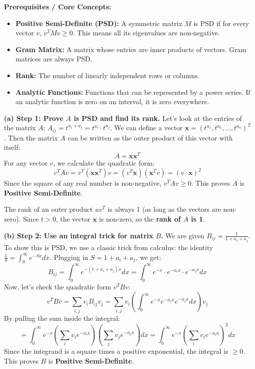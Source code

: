 \begin{solution}
\textbf{Prerequisites / Core Concepts:}
\begin{itemize}
    \item \textbf{Positive Semi-Definite (PSD):} A symmetric matrix $M$ is PSD if for every vector $v$, $v^T M v \geq 0$. This means all its eigenvalues are non-negative.
    \item \textbf{Gram Matrix:} A matrix whose entries are inner products of vectors. Gram matrices are always PSD.
    \item \textbf{Rank:} The number of linearly independent rows or columns.
    \item \textbf{Analytic Functions:} Functions that can be represented by a power series. If an analytic function is zero on an interval, it is zero everywhere.
\end{itemize}

\textbf{(a) Step 1: Prove $A$ is PSD and find its rank.}
Let's look at the entries of the matrix $A$: $A_{ij} = t^{a_i + a_j} = t^{a_i} \cdot t^{a_j}$.
We can define a vector $\mathbf{x} = (t^{a_1}, t^{a_2}, \dots, t^{a_n})^T$. Then the matrix $A$ can be written as the outer product of this vector with itself:
\[ A = \mathbf{x} \mathbf{x}^T \]
For any vector $v$, we calculate the quadratic form:
\[ v^T A v = v^T (\mathbf{x} \mathbf{x}^T) v = (v^T \mathbf{x})(\mathbf{x}^T v) = (v \cdot \mathbf{x})^2 \]
Since the square of any real number is non-negative, $v^T A v \geq 0$. This proves $A$ is \textbf{Positive Semi-Definite}.

The rank of an outer product $uv^T$ is always 1 (as long as the vectors are non-zero). Since $t > 0$, the vector $\mathbf{x}$ is non-zero, so the \textbf{rank of $A$ is 1}.

\textbf{(b) Step 2: Use an integral trick for matrix $B$.}
We are given $B_{ij} = \frac{1}{1 + a_i + a_j}$. To show this is PSD, we use a classic trick from calculus: the identity $\frac{1}{S} = \int_0^\infty e^{-Sx} dx$.
Plugging in $S = 1 + a_i + a_j$, we get:
\[ B_{ij} = \int_0^\infty e^{-(1 + a_i + a_j)x} dx = \int_0^\infty e^{-x} \cdot e^{-a_ix} \cdot e^{-a_jx} dx \]
Now, let's check the quadratic form $v^T B v$:
\[ v^T B v = \sum_{i,j} v_i B_{ij} v_j = \sum_{i,j} v_i \left( \int_0^\infty e^{-x} e^{-a_ix} e^{-a_jx} dx \right) v_j \]
By pulling the sum inside the integral:
\[ = \int_0^\infty e^{-x} \left( \sum_{i} v_i e^{-a_ix} \right) \left( \sum_{j} v_j e^{-a_jx} \right) dx = \int_0^\infty e^{-x} \left( \sum_{i} v_i e^{-a_ix} \right)^2 dx \]
Since the integrand is a square times a positive exponential, the integral is $\geq 0$. This proves $B$ is \textbf{Positive Semi-Definite}.


\end{solution}
